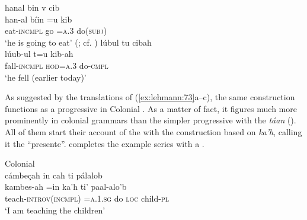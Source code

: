 \documentclass[output=paper]{langsci/langscibook}
\begin{document}
\ex hanal      bin  v      cib\\
\gll   han-al      bíin  =u    kib\\
  eat-\textsc{incmpl}  go    =\textsc{a.3}    do(\textsc{subj})\\
\glt ‘he is going to eat’ (\citealt[71]{Coronel1620}; cf. \citealt[23v]{SanBuenaventura1684})
\newpage
\ex lúbul      tu        cibah\\
\gll lúub-ul    t=u      kib-ah\\
fall-\textsc{incmpl} \textsc{hod=a.3}  do-\textsc{cmpl}\\
\glt‘he fell (earlier today)’ \citep[71]{Coronel1620}
\z
\z 

As suggested by the translations of (\ref{ex:lehmann:73}a--c), the same construction functions as a progressive in Colonial  . As a matter of fact, it figures much more prominently in colonial grammars than the simpler progressive with the  \textit{táan} (). All of them start their account of the  with the  construction based on \textit{ka’h}, calling it the “presente”.  completes the example series with a .

\ea\label{ex:lehmann:74}
Colonial  \\
      cámbeçah          in          cah  ti      pálalob\\
\gll   kambes-ah          =in        ka'h  ti'      paal-alo'b\\
teach-\textsc{introv(incmpl)} \textsc{=a.1.sg}      do    \textsc{loc}    child-\textsc{pl}\\
\glt ‘I am teaching the children’ \citep[72]{Coronel1620}
\z
\end{document}

